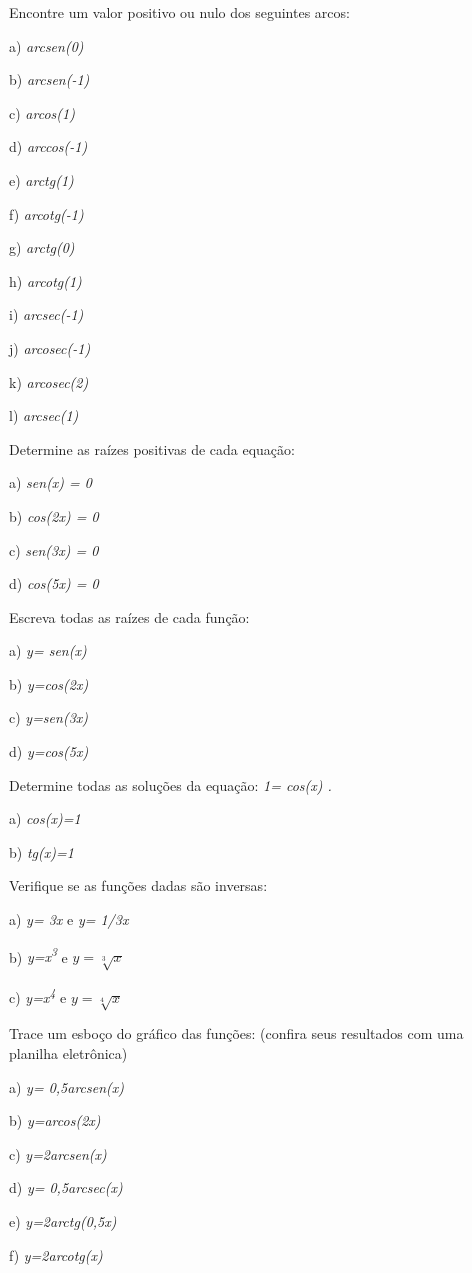 \begin{exercicios}
\exitem{} Encontre um valor positivo ou nulo dos seguintes arcos:

\begin{multicols}{3}
a) \textit{arcsen(0)}

b) \textit{arcsen(-1)}

c) \textit{arcos(1)}

d) \textit{arccos(-1)}

e) \textit{arctg(1)}

f) \textit{arcotg(-1)}

g) \textit{arctg(0)}

h) \textit{arcotg(1)}

i) \textit{arcsec(-1)}

j) \textit{arcosec(-1)}

k) \textit{arcosec(2)}

l) \textit{arcsec(1)}
\end{multicols}

\exitem{} Determine as raízes positivas de cada equação:

a) \textit{sen(x) = 0}

b) \textit{cos(2x) = 0}

c) \textit{sen(3x) = 0}

d) \textit{cos(5x) = 0}

\exitem{} Escreva todas as raízes de cada função:

a)\textit{ y= sen(x)}

b)\textit{ y=cos(2x)}

c)\textit{ y=sen(3x)}

d)\textit{ y=cos(5x)}

\exitem{} Determine todas as soluções da equação: \textit{1= cos(x) .}

a)\textit{ cos(x)=1}

b)\textit{ tg(x)=1 }

\exitem{} Verifique se as funções dadas são inversas:

 a) \textit{y= 3x} e \textit{y= 1/3x  }
 
 b) \textit{y=x\textsuperscript{3}} e \(y=\sqrt[3]{x} \)
 
 c) \textit{y=x\textsuperscript{4}} e \( y=\sqrt[4]{x} \)  

\item Trace um esboço do gráfico das funções: (confira seus resultados com uma planilha eletrônica)

\begin{multicols}{2}
a) \textit{y= 0,5arcsen(x)}

b) \textit{y=arcos(2x)}

c) \textit{y=2arcsen(x)}

d) \textit{y= 0,5arcsec(x)}

e) \textit{y=2arctg(0,5x)}

f) \textit{y=2arcotg(x)}
\end{multicols}
\end{exercicios}

